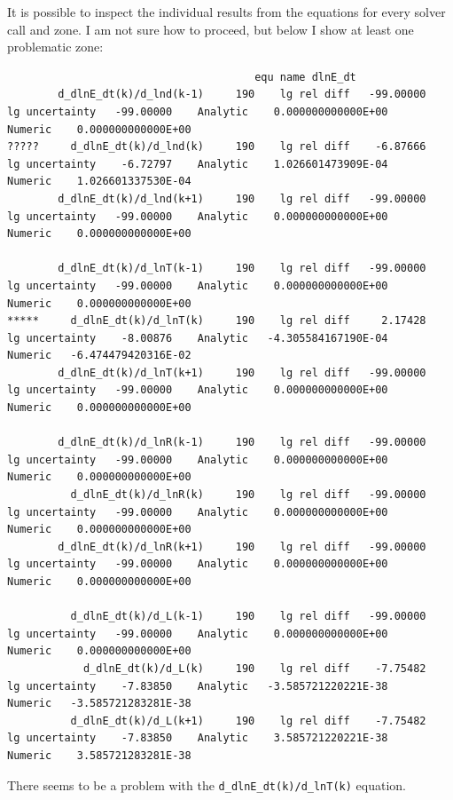 \documentclass[a4paper,10pt]{article}
\begin{document}
It is possible to inspect the individual results from the equations for every solver call and zone. I am not sure how to proceed, but below I show at least one problematic zone:
\begin{verbatim}
                                       equ name dlnE_dt
        d_dlnE_dt(k)/d_lnd(k-1)     190    lg rel diff   -99.00000    lg uncertainty   -99.00000    Analytic    0.000000000000E+00    Numeric    0.000000000000E+00
?????     d_dlnE_dt(k)/d_lnd(k)     190    lg rel diff    -6.87666    lg uncertainty    -6.72797    Analytic    1.026601473909E-04    Numeric    1.026601337530E-04
        d_dlnE_dt(k)/d_lnd(k+1)     190    lg rel diff   -99.00000    lg uncertainty   -99.00000    Analytic    0.000000000000E+00    Numeric    0.000000000000E+00

        d_dlnE_dt(k)/d_lnT(k-1)     190    lg rel diff   -99.00000    lg uncertainty   -99.00000    Analytic    0.000000000000E+00    Numeric    0.000000000000E+00
*****     d_dlnE_dt(k)/d_lnT(k)     190    lg rel diff     2.17428    lg uncertainty    -8.00876    Analytic   -4.305584167190E-04    Numeric   -6.474479420316E-02
        d_dlnE_dt(k)/d_lnT(k+1)     190    lg rel diff   -99.00000    lg uncertainty   -99.00000    Analytic    0.000000000000E+00    Numeric    0.000000000000E+00

        d_dlnE_dt(k)/d_lnR(k-1)     190    lg rel diff   -99.00000    lg uncertainty   -99.00000    Analytic    0.000000000000E+00    Numeric    0.000000000000E+00
          d_dlnE_dt(k)/d_lnR(k)     190    lg rel diff   -99.00000    lg uncertainty   -99.00000    Analytic    0.000000000000E+00    Numeric    0.000000000000E+00
        d_dlnE_dt(k)/d_lnR(k+1)     190    lg rel diff   -99.00000    lg uncertainty   -99.00000    Analytic    0.000000000000E+00    Numeric    0.000000000000E+00

          d_dlnE_dt(k)/d_L(k-1)     190    lg rel diff   -99.00000    lg uncertainty   -99.00000    Analytic    0.000000000000E+00    Numeric    0.000000000000E+00
            d_dlnE_dt(k)/d_L(k)     190    lg rel diff    -7.75482    lg uncertainty    -7.83850    Analytic   -3.585721220221E-38    Numeric   -3.585721283281E-38
          d_dlnE_dt(k)/d_L(k+1)     190    lg rel diff    -7.75482    lg uncertainty    -7.83850    Analytic    3.585721220221E-38    Numeric    3.585721283281E-38
\end{verbatim}
There seems to be a problem with the \lstinline[style=output, breaklines=true]|d_dlnE_dt(k)/d_lnT(k)| equation.
\end{document}
